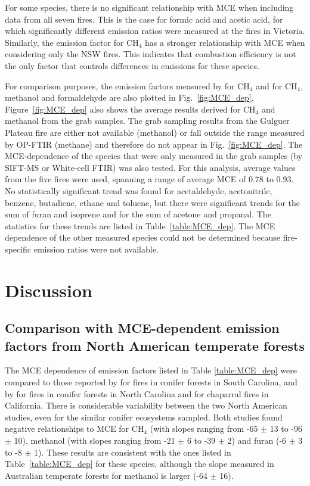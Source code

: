 \documentclass[acp, manuscript]{copernicus}
\begin{document}
For some species, there is no significant relationship with MCE when including data from all seven fires. This is the case for formic acid and acetic acid, for which significantly different emission ratios were measured at the fires in Victoria. Similarly, the emission factor for CH$_4$ has a stronger relationship with MCE when considering only the NSW fires. This indicates that combustion efficiency is not the only factor that controls differences in emissions for these species. 

For comparison purposes, the emission factors measured by \citet{Hurst1996} for CH$_4$ and \citet{Lawson2015} for CH$_4$, methanol and formaldehyde are also plotted in Fig.~\ref{fig:MCE_dep}. Figure~\ref{fig:MCE_dep} also shows the average results derived for CH$_4$ and methanol from the grab samples. The grab sampling results from the Gulguer Plateau fire are either not available (methanol) or fall outside the range measured by OP-FTIR (methane) and therefore do not appear in Fig.~\ref{fig:MCE_dep}. 
The MCE-dependence of the species that were only measured in the grab samples (by SIFT-MS or White-cell FTIR) was also tested. For this analysis, average values from the five fires were used, spanning a range of average MCE of 0.78 to 0.93. No statistically significant trend was found for acetaldehyde, acetonitrile, benzene, butadiene, ethane and toluene, but there were significant trends for the sum of furan and isoprene and for the sum of acetone and propanal. The statistics for these trends are listed in Table~\ref{table:MCE_dep}. The MCE dependence of the other measured species could not be determined because fire-specific emission ratios were not available. 

\section{Discussion}

\subsection{Comparison with MCE-dependent emission factors from North American temperate forests}

The MCE dependence of emission factors listed in Table \ref{table:MCE_dep} were compared to those reported by \citet{Akagi2013} for fires in conifer forests in South Carolina, and by \citet{Burling2011} for fires in conifer forests in North Carolina and for chaparral fires in California. There is considerable variability between the two North American studies, even for the similar conifer ecosystems sampled. 
Both studies found negative relationships to MCE for CH$_4$ (with slopes ranging from -65 $\pm$ 13 to -96 $\pm$ 10), methanol (with slopes ranging from -21 $\pm$ 6 to -39 $\pm$ 2) and furan (-6 $\pm$ 3 to -8 $\pm$ 1). These results are consistent with the ones listed in Table~\ref{table:MCE_dep} for these species, although the slope measured in Australian temperate forests for methanol is larger (-64 $\pm$ 16). 
\end{document}

